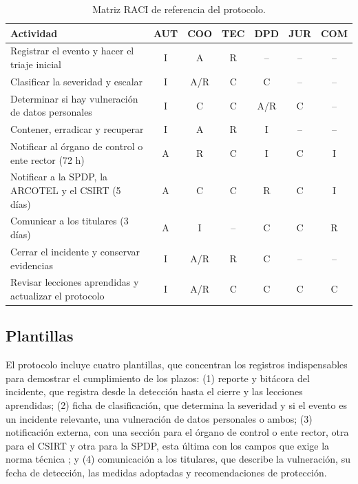 \begin{table}[htbp]
  \centering
  \caption{Matriz RACI de referencia del protocolo.}
  \label{tab:raci}
  \small
  \begin{tabular}{|L{\tabcolsep}|c|c|c|c|c|c|}
    \hline
    \textbf{Actividad} & \textbf{AUT} & \textbf{COO} & \textbf{TEC} & \textbf{DPD} & \textbf{JUR} & \textbf{COM} \\
    \hline
    Registrar el evento y hacer el triaje inicial & I & A & R & -- & -- & -- \\
    \hline
    Clasificar la severidad y escalar & I & A/R & C & C & -- & -- \\
    \hline
    Determinar si hay vulneración de datos personales & I & C & C & A/R & C & -- \\
    \hline
    Contener, erradicar y recuperar & I & A & R & I & -- & -- \\
    \hline
    Notificar al órgano de control o ente rector (72 h) & A & R & C & I & C & I \\
    \hline
    Notificar a la SPDP, la ARCOTEL y el CSIRT (5 días) & A & C & C & R & C & I \\
    \hline
    Comunicar a los titulares (3 días) & A & I & -- & C & C & R \\
    \hline
    Cerrar el incidente y conservar evidencias & I & A/R & R & C & -- & -- \\
    \hline
    Revisar lecciones aprendidas y actualizar el protocolo & I & A/R & C & C & C & C \\
    \hline
  \end{tabular}
  \par\normalsize\raggedright
\end{table}

\subsection{Plantillas}
El protocolo incluye cuatro plantillas, que concentran los registros indispensables para demostrar el cumplimiento de los plazos: (1) reporte y bitácora del incidente, que registra desde la detección hasta el cierre y las lecciones aprendidas; (2) ficha de clasificación, que determina la severidad y si el evento es un incidente relevante, una vulneración de datos personales o ambos; (3) notificación externa, con una sección para el órgano de control o ente rector, otra para el CSIRT y otra para la SPDP, esta última con los campos que exige la norma técnica \cite{spdp2026norma} ; y (4) comunicación a los titulares, que describe la vulneración, su fecha de detección, las medidas adoptadas y recomendaciones de protección.

